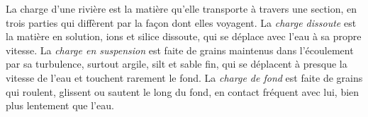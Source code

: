 \begin{definition}\label{def:b1:erosion-transport:load}
La charge d'une rivière est la matière qu'elle transporte à travers une section, en trois
parties qui diffèrent par la façon dont elles voyagent. La \emph{charge dissoute} est
la matière en solution, ions et silice dissoute, qui se déplace avec
l'eau à sa propre vitesse. La \emph{charge en suspension} est
faite de grains maintenus dans l'écoulement par sa turbulence, surtout argile, silt
et sable fin, qui se déplacent à presque la vitesse de l'eau et touchent rarement
le fond. La \emph{charge de fond} est faite de grains qui roulent, glissent
ou sautent le long du fond, en contact fréquent avec lui, bien plus lentement que
l'eau.
\end{definition}

